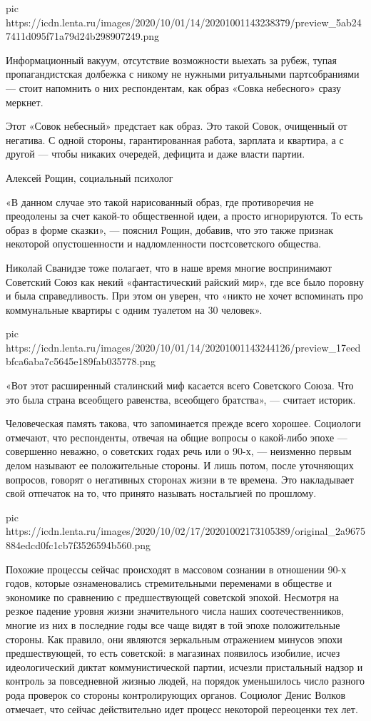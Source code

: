 \ifcmt
pic https://icdn.lenta.ru/images/2020/10/01/14/20201001143238379/preview_5ab247411d095f71a79d24b298907249.png
\fi

Информационный вакуум, отсутствие возможности выехать за рубеж, тупая
пропагандистская долбежка с никому не нужными ритуальными партсобраниями —
стоит напомнить о них респондентам, как образ «Совка небесного» сразу меркнет.

Этот «Совок небесный» предстает как образ. Это такой Совок, очищенный от
негатива. С одной стороны, гарантированная работа, зарплата и квартира, а с
другой — чтобы никаких очередей, дефицита и даже власти партии.

Алексей Рощин, социальный психолог

«В данном случае это такой нарисованный образ, где противоречия не преодолены
за счет какой-то общественной идеи, а просто игнорируются. То есть образ в
форме сказки», — пояснил Рощин, добавив, что это также признак некоторой
опустошенности и надломленности постсоветского общества.

Николай Сванидзе тоже полагает, что в наше время многие воспринимают Советский
Союз как некий «фантастический райский мир», где все было поровну и была
справедливость. При этом он уверен, что «никто не хочет вспоминать про
коммунальные квартиры с одним туалетом на 30 человек».

\ifcmt
pic https://icdn.lenta.ru/images/2020/10/01/14/20201001143244126/preview_17eedbfca6aba7c5645e189fab035778.png
\fi

«Вот этот расширенный сталинский миф касается всего Советского Союза. Что это
была страна всеобщего равенства, всеобщего братства», — считает историк.

Человеческая память такова, что запоминается прежде всего хорошее. Социологи
отмечают, что респонденты, отвечая на общие вопросы о какой-либо эпохе —
совершенно неважно, о советских годах речь или о 90-х, — неизменно первым делом
называют ее положительные стороны. И лишь потом, после уточняющих вопросов,
говорят о негативных сторонах жизни в те времена. Это накладывает свой
отпечаток на то, что принято называть ностальгией по прошлому.

\ifcmt
pic https://icdn.lenta.ru/images/2020/10/02/17/20201002173105389/original_2a9675884edcd0fc1cb7f3526594b560.png
\fi

Похожие процессы сейчас происходят в массовом сознании в отношении 90-х годов,
которые ознаменовались стремительными переменами в обществе и экономике по
сравнению с предшествующей советской эпохой. Несмотря на резкое падение уровня
жизни значительного числа наших соотечественников, многие из них в последние
годы все чаще видят в той эпохе положительные стороны. Как правило, они
являются зеркальным отражением минусов эпохи предшествующей, то есть советской:
в магазинах появилось изобилие, исчез идеологический диктат коммунистической
партии, исчезли пристальный надзор и контроль за повседневной жизнью людей, на
порядок уменьшилось число разного рода проверок со стороны контролирующих
органов. Социолог Денис Волков отмечает, что сейчас действительно идет процесс
некоторой переоценки тех лет.

